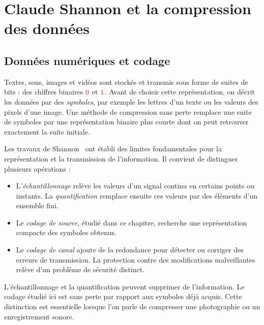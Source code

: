 \chapter{Claude Shannon et la compression des données}
\label{chap-shannon}

\section{Données numériques et codage}
Textes, sons, images et vidéos sont stockés et transmis sous forme de suites de bits : des chiffres binaires ${\color{red}{0}}$ et ${\color{red}{1}}$. Avant de choisir cette représentation, on décrit les données par des \emph{symboles}, par exemple les lettres d'un texte ou les valeurs des pixels d'une image. Une méthode de compression sans perte remplace une suite de symboles par une représentation binaire plus courte dont on peut retrouver exactement la suite initiale.

Les travaux de Shannon~\cite{Shannon1948,shannon1949} ont établi des limites fondamentales pour la représentation et la transmission de l'information. Il convient de distinguer plusieurs opérations :
\begin{itemize}
\item L'\emph{échantillonnage} relève les valeurs d'un signal continu en certains points ou instants. La \emph{quantification} remplace ensuite ces valeurs par des éléments d'un ensemble fini.
\item Le \emph{codage de source}, étudié dans ce chapitre, recherche une représentation compacte des symboles obtenus.
\item Le \emph{codage de canal} ajoute de la redondance pour détecter ou corriger des erreurs de transmission. La protection contre des modifications malveillantes relève d'un problème de sécurité distinct.
\end{itemize}
L'échantillonnage et la quantification peuvent supprimer de l'information. Le codage étudié ici est sans perte par rapport aux symboles déjà acquis. Cette distinction est essentielle lorsque l'on parle de compresser une photographie ou un enregistrement sonore.

